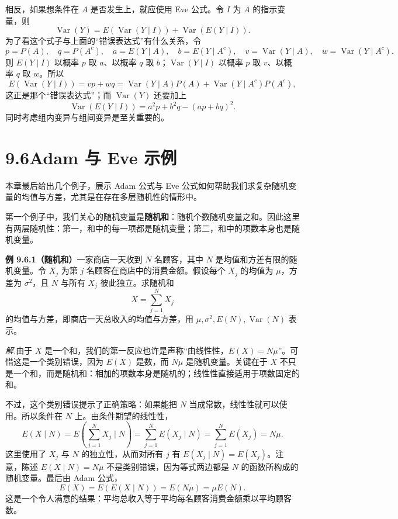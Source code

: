 \documentclass[UTF8,12pt,a4paper,fontset=fandol]{ctexart}
\begin{document}
相反，如果想条件在 $A$ 是否发生上，就应使用 Eve 公式。令 $I$ 为 $A$ 的指示变量，则
\[
  \operatorname{Var}(Y)=E(\operatorname{Var}(Y\mid I))+\operatorname{Var}(E(Y\mid I)).
\]
为了看这个式子与上面的“错误表达式”有什么关系，令
\[
  p=P(A),\quad q=P(A^c),\quad a=E(Y\mid A),\quad b=E(Y\mid A^c),
  \quad v=\operatorname{Var}(Y\mid A),\quad w=\operatorname{Var}(Y\mid A^c).
\]
则 $E(Y\mid I)$ 以概率 $p$ 取 $a$、以概率 $q$ 取 $b$；$\operatorname{Var}(Y\mid I)$ 以概率 $p$ 取 $v$、以概率 $q$ 取 $w$。所以
\[
  E(\operatorname{Var}(Y\mid I))
  =vp+wq=\operatorname{Var}(Y\mid A)P(A)+\operatorname{Var}(Y\mid A^c)P(A^c),
\]
这正是那个“错误表达式”；而 $\operatorname{Var}(Y)$ 还要加上
\[
  \operatorname{Var}(E(Y\mid I))=a^2p+b^2q-(ap+bq)^2.
\]
同时考虑组内变异与组间变异是至关重要的。

\section*{9.6\quad Adam 与 Eve 示例}

本章最后给出几个例子，展示 Adam 公式与 Eve 公式如何帮助我们求复杂随机变量的均值与方差，尤其是在存在多层随机性的情形中。

第一个例子中，我们关心的随机变量是\textbf{随机和}：随机个数随机变量之和。因此这里有两层随机性：第一，和中的每一项都是随机变量；第二，和中的项数本身也是随机变量。

\noindent\textbf{例 9.6.1（随机和）}\quad 一家商店一天收到 $N$ 名顾客，其中 $N$ 是均值和方差有限的随机变量。令 $X_j$ 为第 $j$ 名顾客在商店中的消费金额。假设每个 $X_j$ 的均值为 $\mu$，方差为 $\sigma^2$，且 $N$ 与所有 $X_j$ 彼此独立。求随机和
\[
  X=\sum_{j=1}^{N}X_j
\]
的均值与方差，即商店一天总收入的均值与方差，用 $\mu,\sigma^2,E(N),\operatorname{Var}(N)$ 表示。

\noindent\textit{解.}\quad 由于 $X$ 是一个和，我们的第一反应也许是声称“由线性性，$E(X)=N\mu$”。可惜这是一个类别错误，因为 $E(X)$ 是数，而 $N\mu$ 是随机变量。关键在于 $X$ 不只是一个和，而是随机和：相加的项数本身是随机的；线性性直接适用于项数固定的和。

不过，这个类别错误提示了正确策略：如果能把 $N$ 当成常数，线性性就可以使用。所以条件在 $N$ 上。由条件期望的线性性，
\[
  E(X\mid N)
  =E\left(\sum_{j=1}^{N}X_j\mid N\right)
  =\sum_{j=1}^{N}E(X_j\mid N)
  =\sum_{j=1}^{N}E(X_j)=N\mu.
\]
这里使用了 $X_j$ 与 $N$ 的独立性，从而对所有 $j$ 有 $E(X_j\mid N)=E(X_j)$。注意，陈述 $E(X\mid N)=N\mu$ 不是类别错误，因为等式两边都是 $N$ 的函数所构成的随机变量。最后由 Adam 公式，
\[
  E(X)=E(E(X\mid N))=E(N\mu)=\mu E(N).
\]
这是一个令人满意的结果：平均总收入等于平均每名顾客消费金额乘以平均顾客数。
\end{document}
